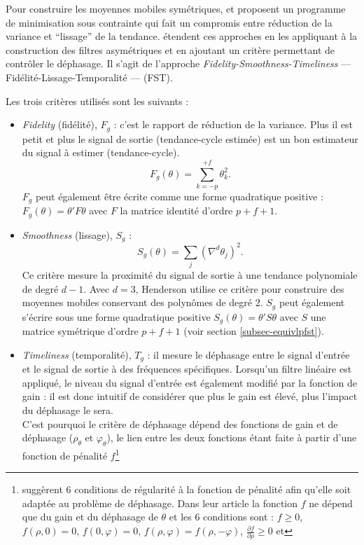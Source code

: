 \documentclass[
  11pt,
  french,
  a4paper]{article}
\newcommand\1{\mathds{1}}
\begin{document}
Pour construire les moyennes mobiles symétriques, \textcite{GrunRehommeLadiray1994} et \textcite{GrayThomson1996} proposent un programme de minimisation sous contrainte qui fait un compromis entre réduction de la variance et ``lissage'' de la tendance.
\textcite{ch15HBSA} étendent ces approches en les appliquant à la construction des filtres asymétriques et en ajoutant un critère permettant de contrôler le déphasage.
Il s'agit de l'approche \emph{Fidelity-Smoothness-Timeliness} --- Fidélité-Lissage-Temporalité --- (FST).

Les trois critères utilisés sont les suivants :

\begin{itemize}
\item
  \emph{Fidelity} (fidélité), \(F_g\) : c'est le rapport de réduction de la variance.
  Plus il est petit et plus le signal de sortie (tendance-cycle estimée) est un bon estimateur du signal à estimer (tendance-cycle).
  \[
  F_g(\theta) = \sum_{k=-p}^{+f}\theta_{k}^{2}.
  \]
  \(F_g\) peut également être écrite comme une forme quadratique positive : \(F_g(\theta)=\theta'F\theta\) avec \(F\) la matrice identité d'ordre \(p+f+1\).
\item
  \emph{Smoothness} (lissage), \(S_g\) :
  \[
  S_g(\theta) = \sum_{j}(\nabla^{d}\theta_{j})^{2}.
  \]
  Ce critère mesure la proximité du signal de sortie à une tendance polynomiale de degré \(d-1\).
  Avec \(d=3\), Henderson utilise ce critère pour construire des moyennes mobiles conservant des polynômes de degré 2.
  \(S_g\) peut également s'écrire sous une forme quadratique positive \(S_g(\theta)=\theta'S\theta\) avec \(S\) une matrice symétrique d'ordre \(p+f+1\) (voir section \ref{subsec-equivlpfst}).
\item
  \emph{Timeliness} (temporalité), \(T_g\) : il mesure le déphasage entre le signal d'entrée et le signal de sortie à des fréquences spécifiques.
  Lorsqu'un filtre linéaire est appliqué, le niveau du signal d'entrée est également modifié par la fonction de gain : il est donc intuitif de considérer que plus le gain est élevé, plus l'impact du déphasage le sera.\\
  C'est pourquoi le critère de déphasage dépend des fonctions de gain et de déphasage (\(\rho_\theta\) et \(\varphi_{\theta}\)), le lien entre les deux fonctions étant faite à partir d'une fonction de pénalité \(f\)\footnote{
    \textcite{ch15HBSA} suggèrent 6 conditions de régularité à la fonction de pénalité afin qu'elle soit adaptée au problème de déphasage.
    Dans leur article la fonction \(f\) ne dépend que du gain et du déphasage de \(\theta\) et les 6 conditions sont : \(f \geq 0\), \(f\left(\rho,0\right)=0\), \(f\left(0,\varphi\right)=0\), \(f\left(\rho,\varphi\right)=f\left(\rho,-\varphi\right)\), \(\frac{\partial f}{\partial \rho} \geq 0\) et
}
\end{itemize}
\end{document}
